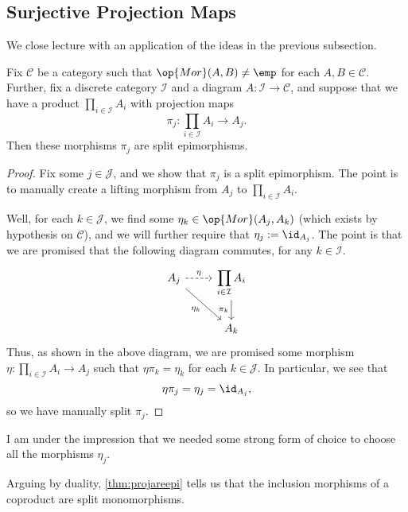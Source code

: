 \subsection{Surjective Projection Maps}
We close lecture with an application of the ideas in the previous subsection.
\begin{theorem} \label{thm:projareepi}
	Fix $\mathcal C$ be a category such that $\op{Mor}(A,B)\ne\emp$ for each $A,B\in\mathcal C$. Further, fix a discrete category $\mathcal I$ and a diagram $A:\mathcal I\to\mathcal C$, and suppose that we have a product $\prod_{i\in\mathcal I}A_i$ with projection maps
	\[\pi_j:\prod_{i\in\mathcal I}A_i\to A_j.\]
	Then these morphisms $\pi_j$ are split epimorphisms.
\end{theorem}
\begin{proof}
	Fix some $j\in\mathcal J$, and we show that $\pi_j$ is a split epimorphism. The point is to manually create a lifting morphism from $A_j$ to $\prod_{i\in\mathcal I}A_i$.
	
	Well, for each $k\in\mathcal J$, we find some $\eta_k\in\op{Mor}(A_j,A_k)$ (which exists by hypothesis on $\mathcal C$), and we will further require that $\eta_j:=\id_{A_j}$. The point is that we are promised that the following diagram commutes, for any $k\in\mathcal I$.
	\[\begin{tikzcd}
		{A_j} & {\displaystyle\prod_{i\in\mathcal I}A_i} \\
		& {A_k}
		\arrow["{\pi_k}"', from=1-2, to=2-2]
		\arrow["\eta", dashed, from=1-1, to=1-2]
		\arrow["{\eta_k}"', from=1-1, to=2-2]
	\end{tikzcd}\]
	Thus, as shown in the above diagram, we are promised some morphism $\eta:\prod_{i\in\mathcal I}A_i\to A_j$ such that $\eta\pi_k=\eta_k$ for each $k\in\mathcal J$. In particular, we see that
	\[\eta\pi_j=\eta_j=\id_{A_j},\]
	so we have manually split $\pi_j$.
\end{proof}
\begin{remark}[Nir]
	I am under the impression that we needed some strong form of choice to choose all the morphisms $\eta_j$.
\end{remark}
\begin{remark}
	Arguing by duality, \autoref{thm:projareepi} tells us that the inclusion morphisms of a coproduct are split monomorphisms.
\end{remark}
